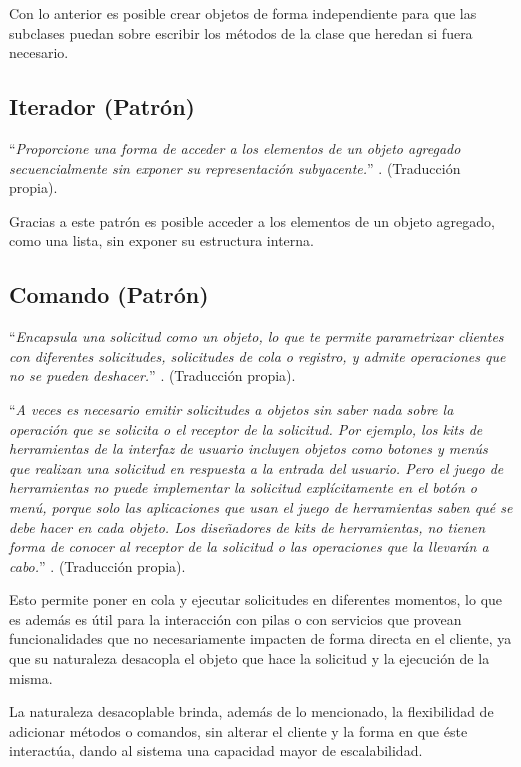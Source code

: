         Con lo anterior es posible crear objetos de forma independiente para que las subclases puedan sobre escribir los métodos de la clase que heredan si fuera necesario.
        
    \subsection{Iterador (Patrón)}
    \label{sub:FrameIterator}
        ``\textit{Proporcione una forma de acceder a los elementos de un objeto agregado secuencialmente sin exponer su representación subyacente.}'' \cite[Pág. 289]{Gamma1994}. (Traducción propia).
        
        Gracias a este patrón es posible acceder a los elementos de un objeto agregado, como una lista,  sin exponer su estructura interna. 
        
    \subsection{Comando (Patrón)}
    \label{sub:FrameCommand}
        ``\textit{Encapsula una solicitud como un objeto, lo que te permite parametrizar clientes con diferentes solicitudes, solicitudes de cola o registro, y admite operaciones que no se pueden deshacer.}'' \cite[Pág. 263]{Gamma1994}. (Traducción propia).
        
        ``\textit{A veces es necesario emitir solicitudes a objetos sin saber nada sobre la operación que se solicita o el receptor de la solicitud. Por ejemplo, los kits de herramientas de la interfaz de usuario incluyen objetos como botones y menús que realizan una solicitud en respuesta a la entrada del usuario. Pero el juego de herramientas no puede implementar la solicitud explícitamente en el botón o menú, porque solo las aplicaciones que usan el juego de herramientas saben qué se debe hacer en cada objeto. Los diseñadores de kits de herramientas, no tienen forma de conocer al receptor de la solicitud o las operaciones que la llevarán a cabo.}'' \cite[Pág. 263]{Gamma1994}. (Traducción propia).
        
        Esto permite poner en cola y ejecutar solicitudes en diferentes momentos, lo que es además es útil para la interacción con pilas o con servicios que provean funcionalidades que no necesariamente impacten de forma directa en el cliente, ya que su naturaleza desacopla el objeto que hace la solicitud y la ejecución de la misma. 
        
        La naturaleza desacoplable brinda, además de lo mencionado, la flexibilidad de adicionar métodos o comandos, sin alterar el cliente y la forma en que éste interactúa, dando al sistema una capacidad mayor de escalabilidad.
    

